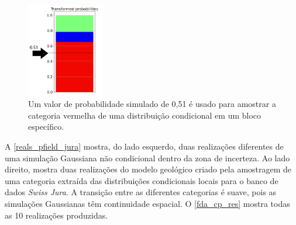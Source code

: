 \begin{figure}[H]
	\caption{\label{samplig_from_dist} Um valor de probabilidade simulado de 0,51 é usado para amostrar a categoria vermelha de uma distribuição condicional em um bloco específico.}
	\centering
		\includegraphics[width=0.3\textwidth]{capitulo_3/imagens/sampling_from_dist.png}
\end{figure}

A \autoref{reals_pfield_jura} mostra, do lado esquerdo, duas realizações diferentes de uma simulação Gaussiana não condicional dentro da zona de incerteza. Ao lado direito, mostra duas realizações do modelo geológico criado pela amostragem de uma categoria extraída das distribuições condicionais locais para o banco de dados \textit{Swiss Jura}. A transição entre as diferentes categorias é suave, pois as simulações Gaussianas têm continuidade espacial. O \autoref{fda_cp_res} mostra todas as 10 realizações produzidas.


